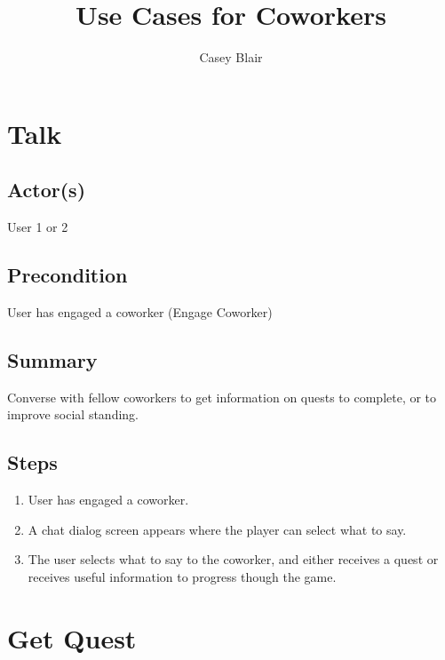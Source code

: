 \documentclass[12pt]{article}
\begin{document}
\title{Use Cases for Coworkers}

\author{Casey Blair}
\maketitle





    \maketitle

    \section{Talk}
	

		\subsection{Actor(s)}
			User 1 or 2
			

		\subsection{Precondition}
				User has engaged a coworker (Engage Coworker)			
	
		\subsection{Summary}
				Converse with fellow coworkers to get information on quests to complete, or to improve social standing.
				\subsection{Steps}
			\begin{enumerate}
			\item User has engaged a coworker.
			\item A chat dialog screen appears where the player can select what to say.
			\item The user selects what to say to the coworker, and either receives a quest or receives useful information to progress though the game.
			
			\end{enumerate}

		



\section{Get Quest}
	
\end{document}
